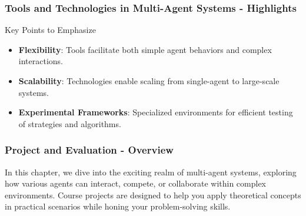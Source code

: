 \documentclass[aspectratio=169]{beamer}
\begin{document}
\begin{frame}[fragile]
    \frametitle{Tools and Technologies in Multi-Agent Systems - Highlights}
    \begin{block}{Key Points to Emphasize}
        \begin{itemize}
            \item \textbf{Flexibility}: Tools facilitate both simple agent behaviors and complex interactions.
            \item \textbf{Scalability}: Technologies enable scaling from single-agent to large-scale systems.
            \item \textbf{Experimental Frameworks}: Specialized environments for efficient testing of strategies and algorithms.
        \end{itemize}
    \end{block}
\end{frame}

\begin{frame}[fragile]
    \frametitle{Project and Evaluation - Overview}
    In this chapter, we dive into the exciting realm of multi-agent systems, exploring how various agents can interact, compete, or collaborate within complex environments. Course projects are designed to help you apply theoretical concepts in practical scenarios while honing your problem-solving skills.
\end{frame}
\end{document}
